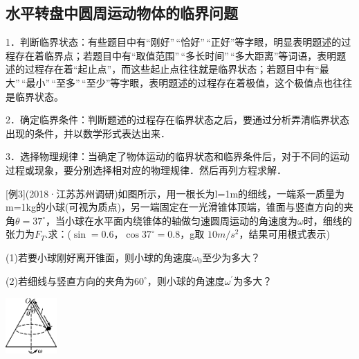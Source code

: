 \documentclass[cn,10.5pt,chinese,mac,chinesefont=founder]{elegantbook}
\begin{document}
\newpage
\subsection{水平转盘中圆周运动物体的临界问题}

1．判断临界状态：有些题目中有``刚好''\,``恰好''\,``正好''等字眼，明显表明题述的过程存在着临界点；若题目中有``取值范围''\,``多长时间''\,``多大距离''等词语，表明题述的过程存在着``起止点''，而这些起止点往往就是临界状态；若题目中有``最大''\,``最小''\,``至多''\,``至少''等字眼，表明题述的过程存在着极值，这个极值点也往往是临界状态。

2．确定临界条件：判断题述的过程存在临界状态之后，要通过分析弄清临界状态出现的条件，并以数学形式表达出来．

3．选择物理规律：当确定了物体运动的临界状态和临界条件后，对于不同的运动过程或现象，要分别选择相对应的物理规律．然后再列方程求解．

{[}例3{]}(2018·江苏苏州调研)如图所示，用一根长为l=1m的细线，一端系一质量为m=1kg的小球(可视为质点)，另一端固定在一光滑锥体顶端，锥面与竖直方向的夹角$\theta=37^\circ$，当小球在水平面内绕锥体的轴做匀速圆周运动的角速度为$\omega$时，细线的张力为$F_T$.求：($\sin=0.6$，$\cos37^\circ=0.8$，g取 $10m/s^2$，结果可用根式表示)

(1)若要小球刚好离开锥面，则小球的角速度$\omega_0$至少为多大？

(2)若细线与竖直方向的夹角为$60^\circ$，则小球的角速度$\omega^{'}$为多大？

\begin{center}\includegraphics[width=0.76667in,height=0.85in]{media/image185.png}\end{center}
\end{document}
